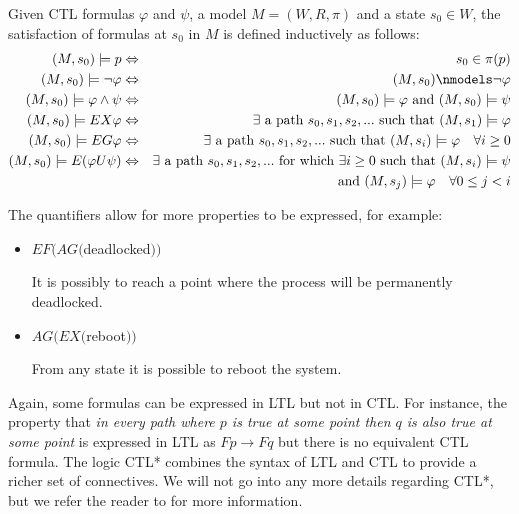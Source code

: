 \documentclass[11pt]{report}
\newenvironment{definition}[1][Definition]{\begin{trivlist}
\item[\hskip \labelsep {\bfseries #1}]}{\end{trivlist}}
\begin{document}
\begin{definition} 
Given CTL formulas $\varphi$ and $\psi$, a model $M = (W, R, \pi)$ and a state $s_0 \in W$, the satisfaction of formulas at $s_0$ in $M$ is defined inductively as follows: 
\begin{eqnarray*}
(M, s_0) \models p &\Leftrightarrow& s_0 \in \pi(p) \\  
(M, s_0) \models \lnot \varphi &\Leftrightarrow& (M, s_0) \nmodels \lnot \varphi\\
(M, s_0) \models \varphi \land \psi &\Leftrightarrow& (M, s_0) \models \varphi \mbox{ and  } (M, s_0) \models \psi \\
(M, s_0) \models EX\varphi &\Leftrightarrow& \exists \mbox{ a path } s_0, s_1, s_2, ... \mbox{ such that } (M, s_1) \models \varphi \\
(M, s_0) \models EG\varphi &\Leftrightarrow& \exists \mbox{ a path } s_0, s_1, s_2, ... \mbox{ such that } (M, s_i) \models \varphi \quad \forall i \geq 0\\
(M, s_0) \models E(\varphi U\psi) &\Leftrightarrow&  \exists \mbox{ a path } s_0, s_1, s_2, ... \mbox{ for which } \exists i \geq 0 \mbox{ such that }  (M, s_i) \models \psi \\ && \mbox{ and }  (M, s_j) \models \varphi \quad \forall 0 \leq j < i
\end{eqnarray*}
\end{definition}
The quantifiers allow for more properties to be expressed, for example:
\begin{itemize}

\item $EF(AG($deadlocked$))$

It is possibly to reach a point where the process will be permanently deadlocked.

\item $AG(EX($reboot$))$ 

From any state it is possible to reboot the system.


\end{itemize}
Again, some formulas can be expressed in LTL but not in CTL. For instance, the property that \textit{in every path where $p$ is true at some point then $q$ is also true at some point} is expressed in LTL as $Fp \rightarrow Fq $ but there is no equivalent CTL formula.
 The logic CTL* combines the syntax of LTL and CTL to provide a richer set of connectives. We will not go into any more details regarding CTL*, but we refer the reader to \cite{ctl*} for more information. 
\end{document}
